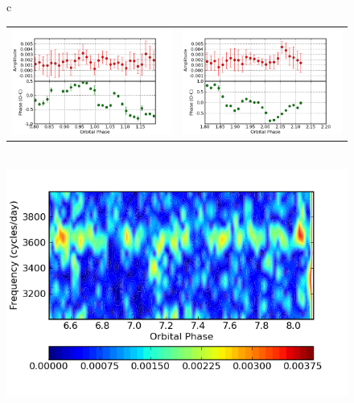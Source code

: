 





\begin{figure}
\begin{narrow}{-1in}{0in}
\begin{tabular}{c}
    \begin{tabular}{cc}
        \includegraphics[width=0.65\columnwidth, bb=0 0 600 400]{images/august_phot/S7655/S7655_23.76_fixed_eclipse1.png} &
 	\includegraphics[width=0.65\columnwidth, bb=0 0 600 400]{images/august_phot/S7655/S7655_23.76_fixed_eclipse2.png}
    \end{tabular}  \\
 
\includegraphics[width=0.65\columnwidth,bb=0 0 600 400]{images/august_phot/S7655/S7655_DNO_trailed_FT.png} 


\end{tabular}
\end{narrow}
\end{figure}

